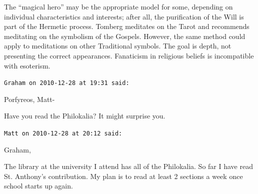 \begin{footnotesize}
\begin{sffamily}
The ``magical hero'' may be the appropriate model for some, depending on individual characteristics and interests; after all, the purification of the Will is part of the Hermetic process. Tomberg meditates on the Tarot and recommends meditating on the symbolism of the Gospels. However, the same method could apply to meditations on other Traditional symbols. The goal is depth, not presenting the correct appearances. Fanaticism in religious beliefs is incompatible with esoterism.

\hfill

\texttt{Graham on 2010-12-28 at 19:31 said:}

Porfyreos, Matt-

Have you read the Philokalia? It might surprise you.

\hfill

\texttt{Matt on 2010-12-28 at 20:12 said:}

Graham,

The library at the university I attend has all of the Philokalia. So far I have read St. Anthony's contribution. My plan is to read at least 2 sections a week once school starts up again.


\hfill

\end{sffamily}
\end{footnotesize}

